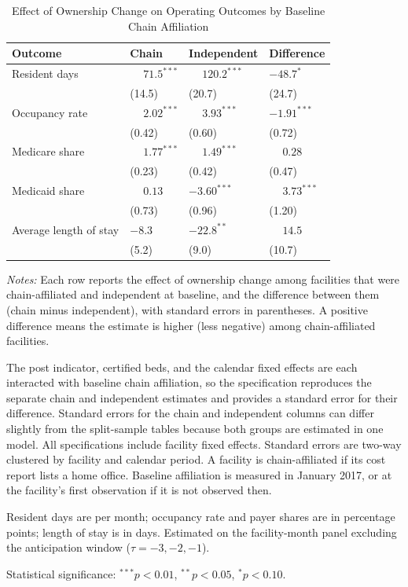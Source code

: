 \begin{table}[!ht]
\centering
\begin{threeparttable}
\caption{Effect of Ownership Change on Operating Outcomes by Baseline Chain Affiliation}
\label{tab:chain-interaction-operating}
\small
\setlength{\tabcolsep}{6pt}

\begin{tabularx}{\textwidth}{@{} l Y Y Y @{}}
\toprule
Outcome & Chain & Independent & Difference \\
\midrule
Resident days & $\phantom{-}71.5^{***}$ & $\phantom{-}120.2^{***}$ & $-48.7^{*}$ \\
 & (14.5) & (20.7) & (24.7) \\[3pt]
Occupancy rate & $\phantom{-}2.02^{***}$ & $\phantom{-}3.93^{***}$ & $-1.91^{***}$ \\
 & (0.42) & (0.60) & (0.72) \\[3pt]
Medicare share & $\phantom{-}1.77^{***}$ & $\phantom{-}1.49^{***}$ & $\phantom{-}0.28$ \\
 & (0.23) & (0.42) & (0.47) \\[3pt]
Medicaid share & $\phantom{-}0.13$ & $-3.60^{***}$ & $\phantom{-}3.73^{***}$ \\
 & (0.73) & (0.96) & (1.20) \\[3pt]
Average length of stay & $-8.3$ & $-22.8^{**}$ & $\phantom{-}14.5$ \\
 & (5.2) & (9.0) & (10.7) \\[3pt]
\bottomrule
\end{tabularx}

\begin{tablenotes}[flushleft]
\footnotesize
\item \textit{Notes:} Each row reports the effect of ownership change among facilities that were chain-affiliated and independent at baseline, and the difference between them (chain minus independent), with standard errors in parentheses. A positive difference means the estimate is higher (less negative) among chain-affiliated facilities.
\item The post indicator, certified beds, and the calendar fixed effects are each interacted with baseline chain affiliation, so the specification reproduces the separate chain and independent estimates and provides a standard error for their difference. Standard errors for the chain and independent columns can differ slightly from the split-sample tables because both groups are estimated in one model. All specifications include facility fixed effects. Standard errors are two-way clustered by facility and calendar period. A facility is chain-affiliated if its cost report lists a home office. Baseline affiliation is measured in January 2017, or at the facility's first observation if it is not observed then.
\item Resident days are per month; occupancy rate and payer shares are in percentage points; length of stay is in days. Estimated on the facility-month panel excluding the anticipation window ($\tau = -3, -2, -1$).
\item Statistical significance: $^{***}p<0.01$, $^{**}p<0.05$, $^{*}p<0.10$.
\end{tablenotes}

\end{threeparttable}
\end{table}
